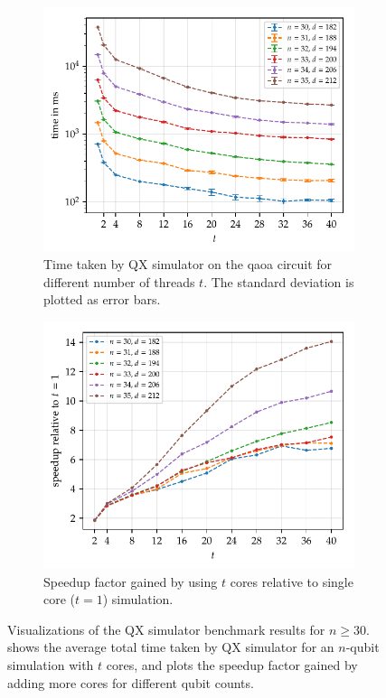 \clearpage

\begin{figure}[ht]
    \centering
    \begin{subfigure}{.9458\textwidth}
        \centering
        \includegraphics[width=0.835\linewidth]{figures/qx_benchmark_plot.pdf}
        \caption[Time taken by QX simulator on the \gls{qaoa} circuit for different number of threads $t$.]{
            Time taken by QX simulator on the \gls{qaoa} circuit for different number of threads $t$.
            The standard deviation is plotted as error bars.
        }
    \label{fig:qx-benchmark-plot}
    \end{subfigure}
    \begin{subfigure}{.9458\textwidth}
        \centering
        \includegraphics[width=0.835\linewidth]{figures/qx_benchmark_speedup_plot.pdf}
        \caption{
            Speedup factor gained by using $t$ cores relative to single core ($t = 1$) simulation.
        }
        \label{fig:qx-speedup-plot}
    \end{subfigure}
    \caption[Visualizations of the QX simulator benchmark results for $n \ge 30$.]{
        Visualizations of the QX simulator benchmark results for $n \ge 30$.
         shows the average total time taken by QX simulator for an $n$-qubit simulation with $t$ cores, and  plots the speedup factor gained by adding more cores for different qubit counts.
    }
\end{figure}

